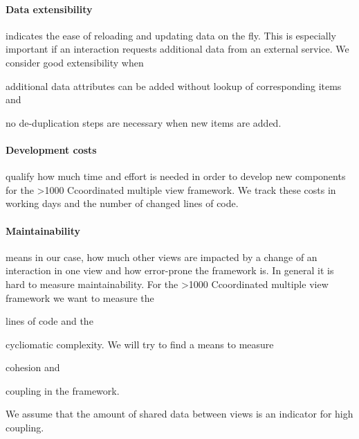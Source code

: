 \documentclass{article}
\newcommand\hmm[1]{\ifnum\ifhmode\spacefactor\else2000\fi>1000 \uppercase{#1}\else#1\fi}
\newcommand{\cmv}{\hmm{c}oordinated multiple view}
\begin{document}
\paragraph{Data extensibility} indicates the ease of reloading and updating data on the fly.
This is especially important if an interaction requests additional data from an external service.
We consider good extensibility when
\begin{enumerate*}[label=(\arabic*)]
  \item
    additional data attributes can be added without lookup of corresponding items and
  \item
    no de-duplication steps are necessary when new items are added.
\end{enumerate*}

\paragraph{Development costs} qualify how much time and effort is needed in order to develop new components for the \cmv{} framework.
We track these costs in working days and the number of changed lines of code.


\paragraph{Maintainability} means in our case, how much other views are impacted by a change of an interaction in one view and how error-prone the framework is.
In general it is hard to measure maintainability.
For the \cmv{} framework we want to measure the
\begin{enumerate*}[label=(\arabic*)]
  \item
    lines of code and the
  \item
    cycliomatic complexity. We will try to find a means to measure
  \item
    cohesion and
  \item 
    coupling in the framework.
\end{enumerate*}
We assume that the amount of shared data between views is an indicator for high coupling.
\end{document}
